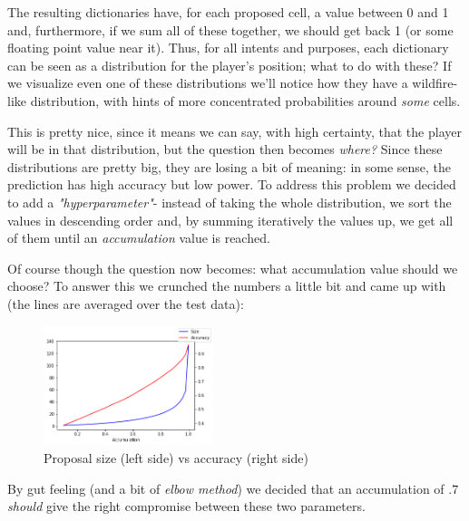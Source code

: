 \documentclass[9pt, a4paper]{IEEEtran}
\begin{document}
    The resulting dictionaries have, for each proposed cell, a value between 0 and 1 and, furthermore, if we sum all of these together, we should get back 1 (or some floating point value near it). Thus, for all intents and purposes, each dictionary can be seen as a distribution for the player's position; what to do with these? If we visualize even one of these distributions we'll notice how they have a wildfire-like distribution, with hints of more concentrated probabilities around \emph{some} cells.

    This is pretty nice, since it means we can say, with high certainty, that the player will be in that distribution, but the question then becomes \emph{where?} Since these distributions are pretty big, they are losing a bit of meaning: in some sense, the prediction has high accuracy but low power. To address this problem we decided to add a \emph{"hyperparameter"}- instead of taking the whole distribution, we sort the values in descending order and, by summing iteratively the values up, we get all of them until an \emph{accumulation} value is reached.

    Of course though the question now becomes: what accumulation value should we choose? To answer this we crunched the numbers a little bit and came up with (the lines are averaged over the test data):

    \begin{figure}[h]
        \caption{Proposal size (left side) vs accuracy (right side)}
        \centering
        \includegraphics[width=0.44\textwidth]{images/size_v_accuracy.png}
    \end{figure}

    By gut feeling (and a bit of \emph{elbow method}) we decided that an accumulation of $.7$ \emph{should} give the right compromise between these two parameters.
\end{document}
